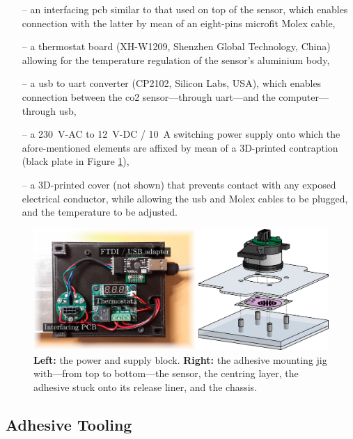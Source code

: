 \begin{enumerate}
	\item[--] an interfacing \gls{pcb} similar to that used on top of the sensor, which enables connection with the latter by mean of an eight-pins microfit Molex cable,
	\item[--] a thermostat board (XH-W1209, Shenzhen Global Technology, China) allowing for the temperature regulation of the sensor's aluminium body,%
	\item[--] a \gls{usb} to \gls{uart} converter (CP2102, Silicon Labs, USA), which enables connection between the \gls{co2} sensor---through \gls{uart}---and the computer---through \gls{usb},
	\item[--] a 230~V-AC to 12~V-DC / 10~A switching power supply onto which the afore-mentioned elements are affixed by mean of a 3D-printed contraption (black plate in Figure \ref{annfig:photo_jig}),
	\item[--] a 3D-printed cover (not shown) that prevents contact with any exposed electrical conductor, while allowing the \gls{usb} and Molex cables to be plugged, and the temperature to be adjusted.
\end{enumerate}

\begin{figure}
	\centering
	\includegraphics[width=\linewidth]{2_appendices/figures/photo_jig_comp}
	\caption[Power and supply block and adhesive mounting jig.]{\textbf{Left:} the power and supply block. \textbf{Right:} the adhesive mounting jig with---from top to bottom---the sensor, the centring layer, the adhesive stuck onto its release liner, and the chassis.}\label{annfig:photo_jig}
\end{figure}

\subsection{Adhesive Tooling}

